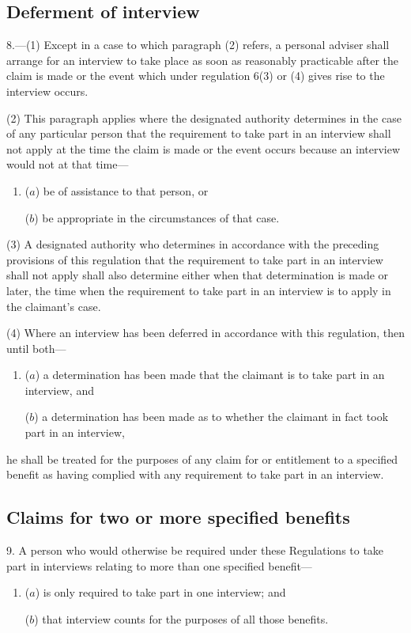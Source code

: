 \documentclass[12pt,a4paper]{article}
\begin{document}
\subsection[8. Deferment of interview]{Deferment of interview}

8.---(1)  Except in a case to which paragraph (2) refers, a personal adviser shall arrange for an interview to take place as soon as reasonably practicable after the claim is made or the event which under regulation 6(3) or (4) gives rise to the interview occurs.

(2) This paragraph applies where the designated authority determines in the case of any particular person that the requirement to take part in an interview shall not apply at the time the claim is made or the event occurs because an interview would not at that time—
\begin{enumerate}\item[]
($a$) be of assistance to that person, or

($b$) be appropriate in the circumstances of that case.
\end{enumerate}

(3) A designated authority who determines in accordance with the preceding provisions of this regulation that the requirement to take part in an interview shall not apply shall also determine either when that determination is made or later, the time when the requirement to take part in an interview is to apply in the claimant’s case.

(4) Where an interview has been deferred in accordance with this regulation, then until both—
\begin{enumerate}\item[]
($a$) a determination has been made that the claimant is to take part in an interview, and

($b$) a determination has been made as to whether the claimant in fact took part in an interview,
\end{enumerate}
he shall be treated for the purposes of any claim for or entitlement to a specified benefit as having complied with any requirement to take part in an interview.

\subsection[9. Claims for two or more specified benefits]{Claims for two or more specified benefits}

9.  A person who would otherwise be required under these Regulations to take part in interviews relating to more than one specified benefit—
\begin{enumerate}\item[]
($a$) is only required to take part in one interview; and

($b$) that interview counts for the purposes of all those benefits.
\end{enumerate}
\end{document}
